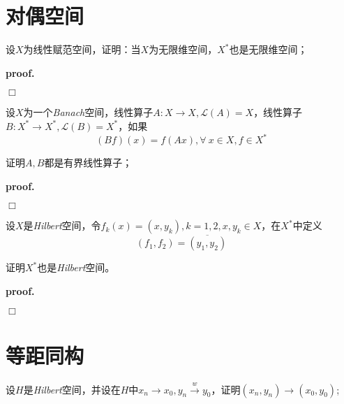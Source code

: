 \section{对偶空间}

\begin{mdframed}
    \begin{question}
        设$X$为线性赋范空间，证明：当$X$为无限维空间，$X^*$也是无限维空间；
    \end{question}
\end{mdframed}

\textbf{proof. }

$\Box$

\begin{mdframed}
    \begin{question}
        设$X$为一个\textsl{Banach}空间，线性算子$A:X\rightarrow X,\mathcal{L}(A)=X$，线性算子$B:X^*\rightarrow X^*,\mathcal{L}(B)=X^*$，如果
        \begin{equation}
            (Bf)(x)=f(Ax),\forall\ x\in X,f\in X^*
        \end{equation}

        证明$A,B$都是有界线性算子；
    \end{question}
\end{mdframed}

\textbf{proof. }

$\Box$

\begin{mdframed}
    \begin{question}
        设$X$是\textsl{Hilbert}空间，令$f_k(x)=(x,y_k),k=1,2,x,y_k\in X$，在$X^*$中定义
        \begin{equation}
            (f_1,f_2)=\overline{(y_1,y_2)}
        \end{equation}

        证明$X^*$也是\textsl{Hilbert}空间。
    \end{question}
\end{mdframed}

\textbf{proof. }

$\Box$

\section{等距同构}

\begin{mdframed}
    \begin{question}
        设$H$是\textsl{Hilbert}空间，并设在$H$中$x_n\rightarrow x_0,y_n\xrightarrow{w} y_0$，证明$(x_n,y_n)\rightarrow (x_0,y_0)$;
    \end{question}
\end{mdframed}

